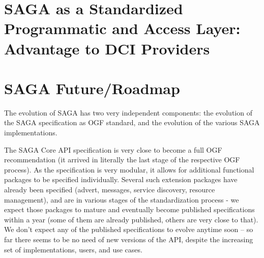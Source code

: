 \documentclass[12pt]{article}
\begin{document}
\section{SAGA as a Standardized Programmatic and Access Layer:
  Advantage to DCI Providers}




\section{SAGA Future/Roadmap}

 The evolution of SAGA has two very independent components: the
 evolution of the SAGA specification as OGF standard, and the
 evolution of the various SAGA implementations.

 The SAGA Core API specification is very close to become a full OGF
 recommendation (it arrived in literally the last stage of the
 respective OGF process).  As the specification is very modular, it
 allows for additional functional packages to be specified
 individually.  Several such extension packages have already been
 specified (advert, messages, service discovery, resource management),
 and are in various stages of the standardization process - we expect
 those packages to mature and eventually become published
 specifications within a year (some of them are already published,
 others are very close to that).  We don't expect any of the published
 specifications to evolve anytime soon -- so far there seems to be no
 need of new versions of the API, despite the increasing set of
 implementations, users, and use cases.
\end{document}
